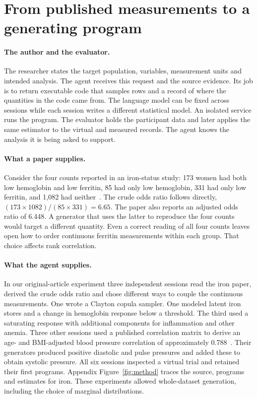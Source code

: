 \documentclass[sigconf,anonymous,review]{acmart}
\begin{document}
\section{From published measurements to a generating program}
\label{sec:method}\label{sec:original}
\paragraph{The author and the evaluator.}
The researcher states the target population, variables, measurement units and intended analysis. The agent receives this request and the source evidence. Its job is to return executable code that samples rows and a record of where the quantities in the code came from. The language model can be fixed across sessions while each session writes a different statistical model. An isolated service runs the program. The evaluator holds the participant data and later applies the same estimator to the virtual and measured records. The agent knows the analysis it is being asked to support.

\paragraph{What a paper supplies.}
Consider the four counts reported in an iron-status study: 173 women had both low hemoglobin and low ferritin, 85 had only low hemoglobin, 331 had only low ferritin, and 1,082 had neither~\cite{zhu}. The crude odds ratio follows directly, $(173\times1082)/(85\times331)=6.65$. The paper also reports an adjusted odds ratio of 6.448. A generator that uses the latter to reproduce the four counts would target a different quantity. Even a correct reading of all four counts leaves open how to order continuous ferritin measurements within each group. That choice affects rank correlation.

\paragraph{What the agent supplies.}
In our original-article experiment three independent sessions read the iron paper, derived the crude odds ratio and chose different ways to couple the continuous measurements. One wrote a Clayton copula sampler. One modeled latent iron stores and a change in hemoglobin response below a threshold. The third used a saturating response with additional components for inflammation and other anemia. Three other sessions used a published correlation matrix to derive an age- and BMI-adjusted blood pressure correlation of approximately 0.788~\cite{jaspert}. Their generators produced positive diastolic and pulse pressures and added these to obtain systolic pressure. All six sessions inspected a virtual trial and retained their first programs. Appendix Figure~\ref{fig:method} traces the source, programs and estimates for iron. These experiments allowed whole-dataset generation, including the choice of marginal distributions.
\end{document}
